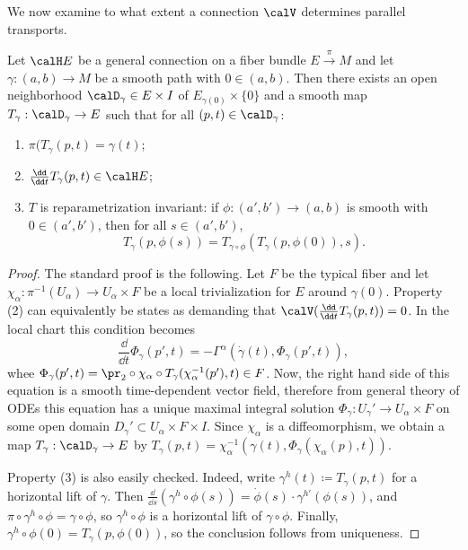 We now examine to what extent a connection $\calV$ determines parallel transports.

\begin{thm}\label{prop parallel tra}
    Let $\calH E$ be a general connection on a fiber bundle $E\overset{\pi}{\to}M$ and let $\gamma:(a,b)\to M$ be a smooth path with $0\in(a,b)$. Then there exists an open neighborhood $\calD_\gamma\in E\times I$ of $E_{\gamma(0)}\times\{0\}$ and a smooth map $T_\gamma:\calD_\gamma\to E$ such that for all $(p,t)\in \calD_\gamma$: 
    \begin{enumerate}[label=(\arabic*)]
        \item $\pi(T_\gamma(p,t)=\gamma(t)$;
        \item $\frac{\dd}{\dd t}T_\gamma(p,t)\in \calH E$;
        \item $T$ is reparametrization invariant: if $\phi:(a',b')\to (a,b)$ is smooth with $0\in(a',b')$, then for all $s\in (a',b')$, 
        \[T_\gamma(p,\phi(s))=T_{\gamma\circ\phi}(T_\gamma(p,\phi(0)),s).\]
    \end{enumerate}
\end{thm}
\begin{proof}
    The standard proof is the following. Let $F$ be the typical fiber and let $\chi_\alpha:\pi^{-1}(U_\alpha)\to U_\alpha\times F$ be a local trivialization for $E$ around $\gamma(0)$. Property (2) can equivalently be states as demanding that $\calV(\frac{\dd}{\dd t}T_\gamma(p,t))=0$. In the local chart this condition becomes
    \[\frac{\dd}{\dd t}\Phi_\gamma(p',t)=-\Gamma^\alpha\left(\dot\gamma(t),\Phi_\gamma(p',t)\right),\]
    whee $\Phi_\gamma(p',t)=\pr_2\circ \chi_\alpha\circ T_\gamma(\chi_\alpha^{-1}(p'),t)\in F$. Now, the right hand side of this equation is a smooth time-dependent vector field, therefore from general theory of ODEs this equation has a unique maximal integral solution $\Phi_\gamma:U_\gamma'\to U_\alpha\times F$ on some open domain $D_\gamma'\subset U_\alpha\times F\times I$. Since $\chi_\alpha$ is a diffeomorphism, we obtain a map $T_\gamma:\calD_\gamma\to E$ by $T_\gamma(p,t)=\chi_\alpha^{-1}(\gamma(t),\Phi_\gamma(\chi_\alpha(p),t))$.

    Property (3) is also easily checked. Indeed, write $\gamma^h(t)\coloneqq T_\gamma(p,t)$ for a horizontal lift of $\gamma$. Then $\frac{\dd}{\dd s}(\gamma^h\circ \phi(s))=\dot\phi(s)\cdot \gamma^{h\prime}(\phi(s))$, and $\pi\circ\gamma^h\circ\phi=\gamma\circ\phi$, so $\gamma^h\circ\phi$ is a horizontal lift of $\gamma\circ\phi$. Finally, $\gamma^h\circ\phi(0)=T_\gamma(p,\phi(0))$, so the conclusion follows from uniqueness.
\end{proof}


